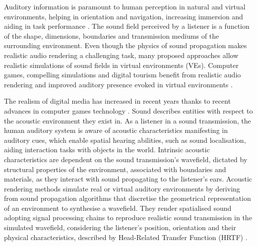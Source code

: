 Auditory information is paramount to human perception in natural and virtual environments, helping in orientation and navigation, increasing immersion and aiding in task performance \citep{lokki2005navigation, bork2015auditory, shivappa2016efficient}. The sound field perceived by a listener is a function of the shape, dimensions, boundaries and transmission mediums of the surrounding environment. Even though the physics of sound propagation makes realistic audio rendering a challenging task, many proposed approaches allow realistic simulations of sound fields in virtual environments (VEs). Computer games, compelling simulations and digital tourism benefit from realistic audio rendering and improved auditory presence evoked in virtual environments \cite{lokki2002creating, selmanovic2020vr, rubio2017immersive}.

The realism of digital media has increased in recent years thanks to recent advances in computer games technology \cite{rubio2017immersive}. Sound describes entities with respect to the acoustic environment they exist in. As a listener in a sound transmission, the human auditory system is aware of acoustic characteristics manifesting in auditory cues, which enable spatial hearing abilities, such as sound localisation, aiding interaction tasks with objects in the world. Intrinsic acoustic characteristics are dependent on the sound transmission's wavefield, dictated by structural properties of the environment, associated with boundaries and materials, as they interact with sound propagating to the listener's ears. Acoustic rendering methods simulate real or virtual auditory environments by deriving from sound propagation algorithms that discretise the geometrical representation of an environment to synthesise a wavefield. They render spatialised sound adopting signal processing chains to reproduce realistic sound transmission in the simulated wavefield, considering the listener's position, orientation and their physical characteristics, described by Head-Related Transfer Function (HRTF) \cite{hulusic2012acoustic}. \par

